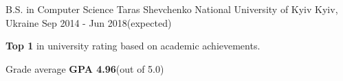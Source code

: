 

\begin{cventries}

  \cventry
    {B.S. in Computer Science} %
    {Taras Shevchenko National University of Kyiv} %
    {Kyiv, Ukraine} %
    {Sep 2014 - Jun 2018(expected)} %
    {
      \begin{cvitems} %
        \item {\textbf{Top 1} in university rating based on academic achievements.}
        \item {Grade average \textbf{GPA 4.96}(out of 5.0)}
      \end{cvitems}
    }
\end{cventries}
